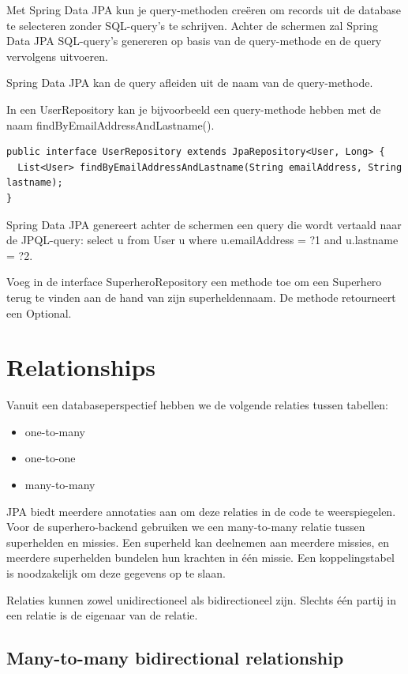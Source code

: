 Met Spring Data JPA kun je query-methoden cre\"eren om records uit de database te selecteren zonder SQL-query's te schrijven. Achter de schermen zal Spring Data JPA SQL-query's genereren op basis van de query-methode en de query vervolgens uitvoeren.

Spring Data JPA kan de query afleiden uit de naam van de query-methode.

In een UserRepository kan je bijvoorbeeld een query-methode hebben met de naam findByEmailAddressAndLastname().

\begin{lstlisting}
public interface UserRepository extends JpaRepository<User, Long> {
  List<User> findByEmailAddressAndLastname(String emailAddress, String lastname);
}
\end{lstlisting}

Spring Data JPA genereert achter de schermen een query die wordt vertaald naar de JPQL-query: select u from User u where u.emailAddress = ?1 and u.lastname = ?2.

\begin{oefening}
Voeg in de interface SuperheroRepository een methode toe om een Superhero terug te vinden aan de hand van zijn superheldennaam. De methode retourneert een Optional.
\end{oefening}


\section{Relationships}
Vanuit een databaseperspectief hebben we de volgende relaties tussen tabellen:
\begin{itemize}
\item one-to-many
\item one-to-one
\item many-to-many
\end{itemize}

JPA biedt meerdere annotaties aan om deze relaties in de code te weerspiegelen.  Voor de superhero-backend gebruiken we een many-to-many relatie tussen superhelden en missies. Een superheld kan deelnemen aan meerdere missies, en meerdere superhelden bundelen hun krachten in één missie. Een koppelingstabel is noodzakelijk om deze gegevens op te slaan.

Relaties kunnen zowel unidirectioneel als bidirectioneel zijn. Slechts één partij in een relatie is de eigenaar van de relatie.


\subsection{Many-to-many bidirectional relationship}

